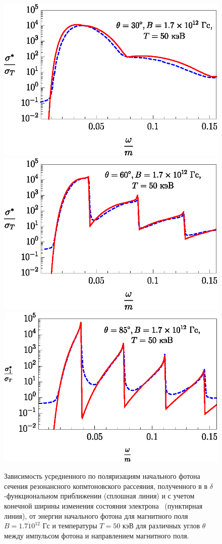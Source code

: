 \documentclass[cp1251%
               ]{jetp} %
\begin{document}
\begin{figure}[t!]\centering
\includegraphics[width=0.9\linewidth,clip]{fig4_1.eps}
\includegraphics[width=0.9\linewidth,clip]{fig4_2.eps}
\includegraphics[width=0.9\linewidth,clip]{fig4_3.eps}
\caption{Зависимость усредненного по поляризациям начального фотона сечения резонансного копмтоновского рассеяния, полученного в в $\delta$-функциональном приближении (сплошная линия) и с учетом конечной ширины изменения состояния электрона~\cite{Harding:1991} (пунктирная линия), от энергии начального фотона для магнитного поля $B = 1.7 \dot 10^{12}$ Гс и температуры $T=50$ кэВ для различных углов $\theta$ между импульсом фотона и направлением магнитного поля.}
\label{fig4}
\end{figure}
\end{document}
